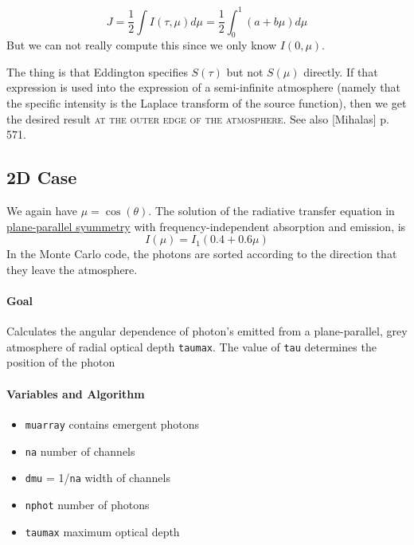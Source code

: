 \documentclass[../main/main.tex]{subfiles}
\begin{document}
\begin{equation}
J = \frac{1}{2} \int I(\tau,\mu) d\mu = \frac{1}{2} \int_0^1 (a+b\mu)d\mu
\end{equation}
But we can not really compute this since we only know $I(0,\mu)$.

The thing is that Eddington specifies $S(\tau)$ but not $S(\mu)$ directly. If that expression is used into the expression of a semi-infinite atmosphere (namely that the specific intensity is the Laplace transform of the source function), then we get the desired result \textsc{at the outer edge of the atmosphere}. See also [Mihalas] p. 571.

\noindent{}

\newpage
\subsection{2D Case}
We again have $\mu = \cos(\theta)$. The solution of the radiative transfer equation in \underline{plane-parallel syummetry} with frequency-independent absorption and emission, is 
\begin{equation}
I(\mu) = I_1 (0.4 + 0.6\mu)
\label{2D_case_Eddington_barbier}
\end{equation}
In the Monte Carlo code, the photons are sorted according to the direction that they leave the atmosphere.

\paragraph{Goal}
Calculates the angular dependence of photon's emitted from a plane-parallel, grey atmosphere of radial optical depth \texttt{taumax}. The value of \texttt{tau} determines the position of the photon

\paragraph{Variables and Algorithm}
\begin{itemize}
\item \texttt{muarray} contains emergent photons
\item \texttt{na} number of channels
\item \texttt{dmu} = 1/\texttt{na} width of channels
\item \texttt{nphot} number of photons
\item \texttt{taumax} maximum optical depth
\end{itemize}
\end{document}
